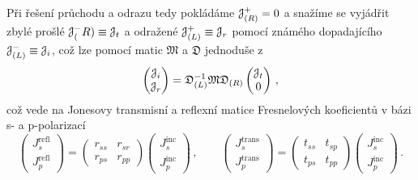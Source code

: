 Při řešení průchodu a odrazu tedy pokládáme $\mathcal{J}^+_{(R)}=0$ a snažíme se vyjádřit zbylé prošlé $\mathcal{J}^-_(R) \equiv \mathcal{J}_t$ a odražené $\mathcal{J}^+_{(L)} \equiv \mathcal{J}_r$ pomocí známého dopadajícího $\mathcal{J}^-_{(L)} \equiv \mathcal{J}_i$, což lze pomocí matic $\mathfrak{M}$ a $\mathfrak{D}$ jednoduše z
\begin{equation}
    \begin{pmatrix} \mathcal{J}_i \\ \mathcal{J}_r \end{pmatrix}
    =\mathfrak{D}_{(L)}^{-1} \mathfrak{M} \mathfrak{D}_{(R)} 
    \begin{pmatrix} \mathcal{J}_t \\ 0 \end{pmatrix} \,,
\end{equation}
což vede na Jonesovy transmisní a reflexní matice Fresnelových koeficientů v bázi s- a p-polarizací
\begin{equation}
    \begin{pmatrix} J^\textrm{refl}_s \\ J^\textrm{refl}_p \end{pmatrix}
        =\begin{pmatrix} r_{ss} & r_{sr} \\ r_{ps} & r_{pp} \end{pmatrix}
        \begin{pmatrix} J^\textrm{inc}_s \\ J^\textrm{inc}_p \end{pmatrix} 
    \,, \qquad \begin{pmatrix} J^\textrm{trans}_s \\ J^\textrm{trans}_p \end{pmatrix}
        =\begin{pmatrix} t_{ss} & t_{sp} \\ t_{ps} & t_{pp} \end{pmatrix}
        \begin{pmatrix} J^\textrm{inc}_s \\ J^\textrm{inc}_p \end{pmatrix} \,.
\end{equation}

